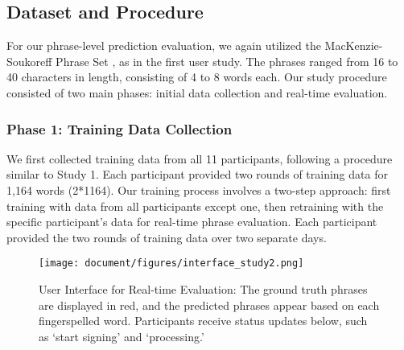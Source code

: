 \subsection{Dataset and Procedure}

For our phrase-level prediction evaluation, we again utilized the MacKenzie-Soukoreff Phrase Set \cite{mackenzie2003phrase}, as in the first user study. The phrases ranged from 16 to 40 characters in length, consisting of 4 to 8 words each. Our study procedure consisted of two main phases: initial data collection and real-time evaluation.



\subsubsection{Phase 1: Training Data Collection}
We first collected training data from all 11 participants, following a procedure similar to Study 1. Each participant provided two rounds of training data for 1,164 words (2*1164). Our training process involves a two-step
approach: first training with data from all participants except one, then retraining with the specific participant’s data
 for real-time phrase evaluation. Each participant provided the two rounds of training data over two separate days. 
\begin{figure}[t]
  \texttt{[image: document/figures/interface\_study2.png]}
  \caption{User Interface for Real-time Evaluation: The ground truth phrases are displayed in red, and the predicted phrases appear based on each fingerspelled word. Participants receive status updates below, such as `start signing' and `processing.'  }
  \label{fig:interface_study2}
\end{figure}
